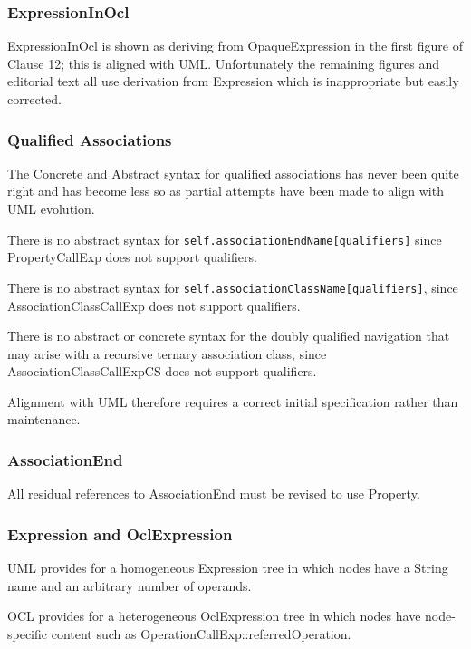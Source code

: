 \documentclass{eceasst}
\begin{document}
\subsubsection{ExpressionInOcl}

ExpressionInOcl is shown as deriving from OpaqueExpression in the first figure of Clause 12; this is aligned with UML. Unfortunately the remaining figures and editorial text all use derivation from Expression which is inappropriate but easily corrected.

\subsubsection{Qualified Associations}

The Concrete and Abstract syntax for qualified associations has never been quite right and has become less so as partial attempts have been made to align with UML evolution.

There is no abstract syntax for \verb|self.associationEndName[qualifiers]| since PropertyCallExp does not support qualifiers.

There is no abstract syntax for \verb|self.associationClassName[qualifiers]|, since AssociationClassCallExp does not support qualifiers.

There is no abstract or concrete syntax for the doubly qualified navigation that may arise with a recursive ternary association class, since AssociationClassCallExpCS does not support qualifiers.

Alignment with UML therefore requires a correct initial specification rather than maintenance. 

\subsubsection{AssociationEnd}

All residual references to AssociationEnd must be revised to use Property.

\subsubsection{Expression and OclExpression}

UML provides for a homogeneous Expression tree in which nodes have a String name and an arbitrary number of operands.

OCL provides for a heterogeneous OclExpression tree in which nodes have node-specific content such as OperationCallExp::referredOperation.
\end{document}
